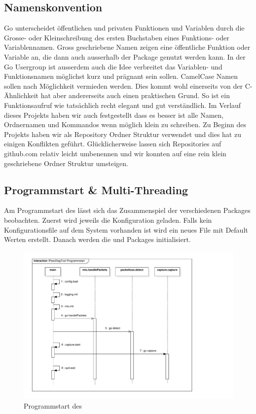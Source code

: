 \subsection{Namenskonvention}
Go unterscheidet öffentlichen und privaten Funktionen und Variablen durch die Grosse- oder Kleinschreibung des ersten Buchstaben eines Funktions- oder Variablennamen. Gross geschriebene Namen zeigen eine öffentliche Funktion oder Variable an, die dann auch ausserhalb der Package genutzt werden kann.
In der Go Usergroup ist ausserdem auch die Idee verbreitet das Variablen- und Funktionsnamen möglichst kurz und prägnant sein sollen. CamelCase Namen sollen nach Möglichkeit vermieden werden. Dies kommt wohl einerseits von der C-Ähnlichkeit hat aber andererseits auch einen praktischen Grund. So ist ein Funktionsaufruf wie  tatsächlich recht elegant und gut verständlich.
Im Verlauf dieses Projekts haben wir auch festgestellt dass es besser ist alle Namen, Ordnernamen und Kommandos wenn möglich klein zu schreiben. Zu Beginn des Projekts haben wir  als Repository Ordner Struktur verwendet und dies hat zu einigen Konflikten geführt. Glücklicherweise lassen sich Repositories auf github.com relativ leicht umbenennen und wir konnten auf eine rein klein geschriebene Ordner Struktur umsteigen.

\subsection{Programmstart \& Multi-Threading}
Am Programmstart des \tool{} lässt sich das Zusammenspiel der verschiedenen Packages beobachten. Zuerst wird jeweils die Konfiguration geladen. Falls kein Konfigurationsfile auf dem System vorhanden ist wird ein neues File mit Default Werten erstellt. Danach werden die  und  Packages initialisiert.

\begin{figure}[ht]
    \begin{center}
        \includegraphics[trim=30 20 150 30,clip,width=\textwidth]{mainpart/implementation/img/programmstart}
    \end{center}
    \caption{Programmstart des \tool{}}
\end{figure}

